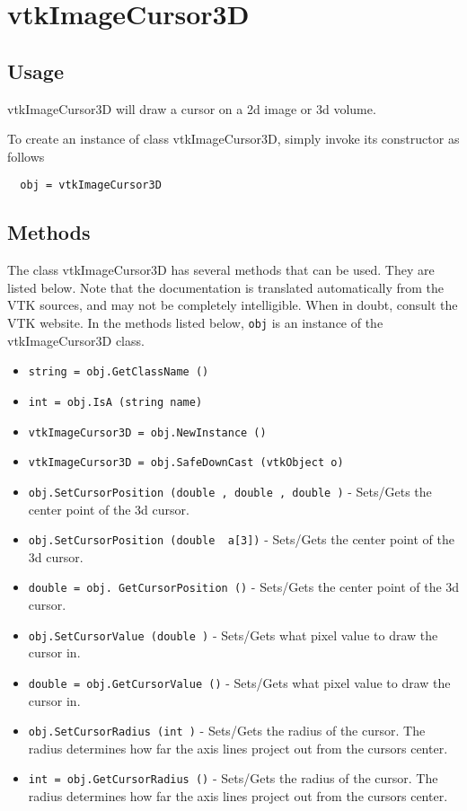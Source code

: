 \section{vtkImageCursor3D}

\subsection{Usage}

 vtkImageCursor3D will draw a cursor on a 2d image or 3d volume.

To create an instance of class vtkImageCursor3D, simply
invoke its constructor as follows
\begin{verbatim}
  obj = vtkImageCursor3D
\end{verbatim}
\subsection{Methods}

The class vtkImageCursor3D has several methods that can be used.
  They are listed below.
Note that the documentation is translated automatically from the VTK sources,
and may not be completely intelligible.  When in doubt, consult the VTK website.
In the methods listed below, \verb|obj| is an instance of the vtkImageCursor3D class.
\begin{itemize}
\item  \verb|string = obj.GetClassName ()|

\item  \verb|int = obj.IsA (string name)|

\item  \verb|vtkImageCursor3D = obj.NewInstance ()|

\item  \verb|vtkImageCursor3D = obj.SafeDownCast (vtkObject o)|

\item  \verb|obj.SetCursorPosition (double , double , double )| -  Sets/Gets the center point of the 3d cursor.

\item  \verb|obj.SetCursorPosition (double  a[3])| -  Sets/Gets the center point of the 3d cursor.

\item  \verb|double = obj. GetCursorPosition ()| -  Sets/Gets the center point of the 3d cursor.

\item  \verb|obj.SetCursorValue (double )| -  Sets/Gets what pixel value to draw the cursor in.

\item  \verb|double = obj.GetCursorValue ()| -  Sets/Gets what pixel value to draw the cursor in.

\item  \verb|obj.SetCursorRadius (int )| -  Sets/Gets the radius of the cursor. The radius determines
 how far the axis lines project out from the cursors center.

\item  \verb|int = obj.GetCursorRadius ()| -  Sets/Gets the radius of the cursor. The radius determines
 how far the axis lines project out from the cursors center.

\end{itemize}
